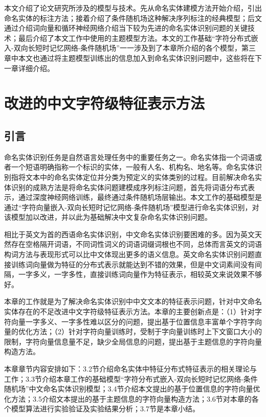 \documentclass[winfonts,master,oneside,nobackinfo]{njuthesis}
\begin{document}
本文介绍了论文研究所涉及的模型与技术。先从命名实体建模方法开始介绍，引出命名实体的标注方法；接着介绍了条件随机场这种解决序列标注的经典模型；后文通过介绍词向量和循环神经网络介绍当下较为先进的命名实体识别问题的关键技术；最后介绍了本文工作中使用的主题模型方法。本文的工作基础“字符分布式嵌入-双向长短时记忆网络-条件随机场”一一涉及到了本章所介绍的各个模型，第三章中本文也通过将主题模型训练出的信息加入到命名实体识别问题中，这些将在下一章详细介绍。

\chapter{改进的中文字符级特征表示方法}

\section{引言}

命名实体识别任务是自然语言处理任务中的重要任务之一。命名实体指一个词语或者一个短语明确指称一个标识的实体，一般有人名、机构名、地名等。命名实体识别指将文本中的命名实体定位并分类为预定义的实体类别的过程。目前解决命名实体识别的成熟方法是将命名实体问题建模成序列标注问题，首先将词语分布式表示，通过深度神经网络训练，最终通过条件随机场层输出。本文工作的基础模型是通过“字符向量嵌入-双向长短时记忆网络-条件随机场”模型进行命名实体识别，对该模型加以改进，并以此为基础解决中文复杂命名实体识别问题。

相比于英文为首的西语命名实体识别，中文命名实体识别要困难的多。因为英文天然存在空格隔开词语，不同词性词义的词语词缀词根也不同，总体而言英文的词语构词方法与表现形式可以比中文体现出更多的语义信息。英文命名实体识别问题直接训练词向量做为特征的分布式表示就能达到不错的效果，但是中文词素间没有间隔，一字多义，一字多性，直接训练词向量作为特征表示，相较英文来说效果不够好。

本章的工作就是为了解决命名实体识别中中文文本的特征表示问题，针对中文命名实体存在的不足改进中文字符级特征表示方法。本章的主要创新点是：（1）针对字符向量一字多义、一字多性难以区分的问题，提出基于位置信息丰富单个字符字向量的优化方法；（2）针对字符向量训练时，受制于字向量训练时上下文窗口大小的限制，字符向量信息量不足，缺少全局信息的问题，提出基于主题信息的字符向量构造方法。

本章章节内容安排如下：3.2节介绍命名实体中特征分布式特征表示的相关理论与工作；3.3节介绍本章工作的基础模型“字符分布式嵌入-双向长短时记忆网络-条件随机场”中文命名实体识别模型；3.4节介绍本文提出的基于位置信息的字符向量优化方法；3.5介绍文本提出的基于主题信息的字符向量构造方法；3.6节对本章的各个模型算法进行实验验证及实验结果分析；3.7节是本章小结。
\end{document}
